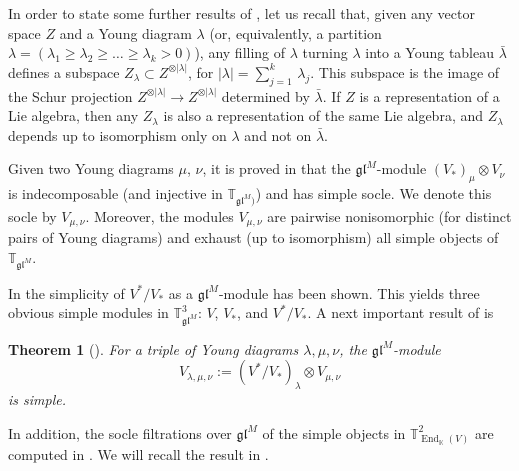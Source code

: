 \documentclass[11pt]{article}
\theoremstyle{plain}
\newtheorem{theorem}[lemma]{Theorem}
\theoremstyle{nonumberplain}
\theoremstyle{plain}
\theoremstyle{nonumberplain}
\newcommand\bK{{\mathbb K}}
\newcommand\bT{{\mathbb T}}
\newcommand\fgl{\mathfrak{gl}}
\DeclareMathOperator{\End}{\mathrm{End}}
\begin{document}
In order to state some further results of {\cite{Chi14}}, let us recall that, given any vector space $Z$ and a Young diagram $\lambda$ (or, equivalently, a partition $\lambda=\left(\lambda_1\geq \lambda_2\geq \ldots\geq \lambda_k>0\right)$), any filling of $\lambda$ turning $\lambda$ into a Young tableau $\bar{\lambda}$ defines a subspace $Z_\lambda \subset Z^{\otimes|\lambda|}$, for $|\lambda|=\sum_{j=1}^k\,\lambda_j$.  %
This subspace is the image of the Schur projection $Z^{\otimes|\lambda|}\to Z^{\otimes|\lambda|}$ determined by $\bar{\lambda}$.  If $Z$ is a representation of a Lie algebra, then any $Z_\lambda$ is also a representation of the same Lie algebra, and $Z_\lambda$ depends up to isomorphism only on $\lambda$ and not on $\bar{\lambda}$.

Given two Young diagrams $\mu$, $\nu$, it is proved in \cite{DPS} that the $\fgl^M$-module $\left(V_*\right)_\mu\otimes V_\nu$ is indecomposable (and injective in $\bT_{\fgl^M)}$) and has simple socle.  We denote this socle by $V_{\mu,\nu}$.  Moreover, the modules $V_{\mu,\nu}$ are pairwise nonisomorphic (for distinct pairs of Young diagrams) and exhaust  (up to isomorphism) all simple objects of $\bT_{\fgl^M}$.

In {\cite{Chi14}} the simplicity of $V^*/V_*$ as a $\fgl^M$-module has been shown.  This yields three obvious simple modules in $\bT^3_{\fgl^M}$: $V$, $V_*$, and $V^*/V_*$.  A next important result of {\cite{Chi14}} is

\begin{theorem}[{{\cite{Chi14}}}]\label{th.chi14}  For a triple of Young diagrams $\lambda,\mu,\nu$, the $\fgl^M$-module 
$$V_{\lambda,\mu,\nu}:=\left(V^*/V_*\right)_\lambda\otimes V_{\mu,\nu}$$
is simple.
\end{theorem}

In addition, the socle filtrations over $\fgl^M$ of the simple objects in $\bT^2_{\End_\bK(V)}$ are computed in {\cite{Chi14}}.  We will recall the result in .
\end{document}
